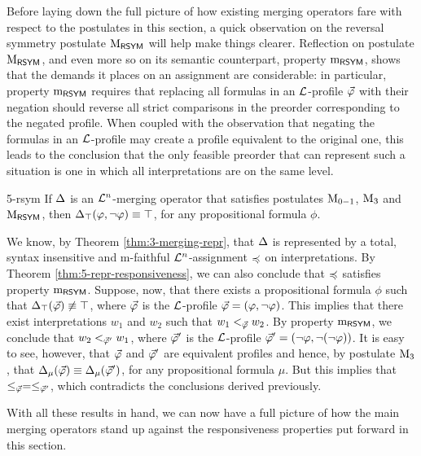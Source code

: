 Before laying down the full picture of how existing merging operators 
fare with respect to the postulates in this section,
a quick observation on the reversal symmetry postulate $\ppm{\RSYM}$
will help make things clearer. Reflection on postulate $\ppm{\RSYM}$,
and even more so on its semantic counterpart, property $\oom{\RSYM}$,
shows that the demands it places on an assignment are considerable:
in particular, property $\oom{\RSYM}$ requires that 
replacing all formulas in an $\L$-profile $\P$ with their negation 
should reverse all strict comparisons in the preorder 
corresponding to the negated profile.
When coupled with the observation that negating the formulas 
in an $\L$-profile may create a profile equivalent to the original one,
this leads to the conclusion that the only feasible 
preorder that can represent such a situation is one 
in which all interpretations are on the same level.

\begin{lem}{}{5-rsym}
	If $\me$ is an $\L^{n}$-merging operator that satisfies 
	postulates $\ppm{0-1}$, $\ppm{3}$ and $\ppm{\RSYM}$, then 
	$\me_{\top}(\phi,\lnot\phi)\equiv\top$,
	for any propositional formula $\phi$.
\end{lem}
\begin{prf*}{}{}%
	We know, by Theorem \ref{thm:3-merging-repr}, that $\me$
	is represented by a total, syntax insensitive and m-faithful 
	$\L^n$-assignment $\as$ on interpretations.
	By Theorem \ref{thm:5-repr-responsiveness},
	we can also conclude that $\as$ satisfies property $\oom{\RSYM}$.
	Suppose, now, that there exists a propositional formula $\phi$
	such that $\me_{\top}(\P)\not\equiv\top$,
	where $\P$ is the $\L$-profile $\P=(\phi,\lnot\phi)$.
	This implies that there exist interpretations $w_1$ and $w_2$
	such that $w_1<_{\P}w_2$.
	By property $\oom{\RSYM}$, we conclude that $w_2<_{\P'}w_1$,
	where $\P'$ is the $\L$-profile $\P'=(\lnot\phi,\lnot(\lnot\phi))$.
	It is easy to see, however, that $\P$ and $\P'$ are equivalent profiles
	and hence, by postulate $\ppm{3}$,
	that $\me_{\mu}(\P)\equiv \me_{\mu}(\P')$,
	for any propositional formula $\mu$.
	But this implies that $\le_{\P}=\le_{\P'}$,
	which contradicts the conclusions derived previously.
\end{prf*}

With all these results in hand, we can now have a full picture
of how the main merging operators stand up 
against the responsiveness properties 
put forward in this section.

